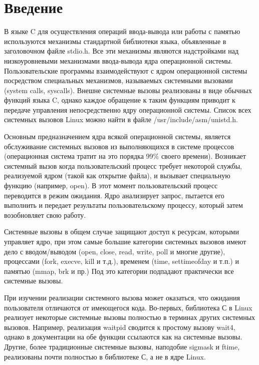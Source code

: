 \newpage
\section*{Введение}

В языке C для осуществления операций ввода-вывода или работы с памятью используются механизмы стандартной библиотеки языка, объявленные в заголовочном файле stdio.h. Все эти механизмы являются надстройками над низкоуровневыми механизмами ввода-вывода ядра операционной системы. Пользовательские программы взаимодействуют с ядром операционной системы посредством специальных механизмов, называемых системными вызовами (system calls, syscalls). Внешне системные вызовы реализованы в виде обычных функций языка C, однако каждое обращение к таким функциям приводит к передаче управления непосредственно ядру операционной системы. Список всех системных вызовов Linux можно найти в файле /usr/include/asm/unistd.h\cite{IvanovN}.

Основным предназначением ядра всякой операционной системы, является обслуживание системных вызовов из выполняющихся в системе процессов (операционная система тратит на это порядка 99\% своего времени)\cite{Cilyuric}. Возникает системный вызов когда пользовательский процесс требует некоторой службы, реализуемой ядром (такой как открытие файла), и вызывает специальную функцию (например, open). В этот момент пользовательский процесс переводится в режим ожидания. Ядро анализирует запрос, пытается его выполнить и передает результаты пользовательскому процессу, который затем возобновляет свою работу. 

Системные вызовы в общем случае защищают доступ к ресурсам, которыми управляет ядро, при этом самые большие категории системных вызовов имеют дело с вводом/выводом (open, close, read, write, poll и многие другие), процессами (fork, execve, kill и т.д.), временем (time, settimeofday и т.п.) и памятью (mmap, brk и пр.) Под это категории подпадают практически все системные вызовы\cite{Maxwell}.

При изучении реализации системного вызова может оказаться, что ожидания пользователя отличаются от имеющегося кода. Во-первых, библиотека С в Linux реализует некоторые системные вызовы полностью в терминах других системных вызовов. Например, реализация waitpid сводится к простому вызову wait4, однако в документации на обе функции ссылаются как на системные вызовы. Другие, более традиционные системные вызовы, наподобие sigmask и ftime, реализованы почти полностью в библиотеке С, а не в ядре Linux.

